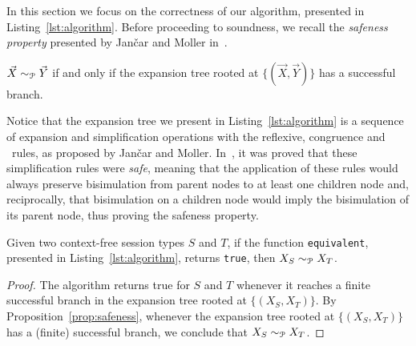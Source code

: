 In this section we focus on the correctness of our algorithm,
presented in Listing~\ref{lst:algorithm}.
Before proceeding to soundness, we recall the \emph{safeness property}
presented by Jan{\v{c}}ar and Moller in~\cite{janvcar1999techniques}.

\begin{proposition} 
\label{prop:safeness}
	$\vec X \sim_{\mathcal P} \vec Y$ if and only if the expansion tree rooted
	at $\{(\vec X, \vec Y)\}$ has a successful branch.
\end{proposition}

Notice that the expansion tree we present in Listing~\ref{lst:algorithm} is
a sequence of expansion and simplification operations with the reflexive,
congruence and \BPA\ rules, as proposed by Jan{\v{c}}ar and Moller.
In~\cite{janvcar1999techniques}, it was proved that these simplification
rules were \emph{safe}, meaning that the application of these rules would
always preserve bisimulation from parent nodes to at least one children node
and, reciprocally, that bisimulation on a children node would imply the
bisimulation of its parent node, thus proving the safeness property.


\begin{theorem}
	Given two context-free session types $S$ and $T$, if the function
	\lstinline|equivalent|, presented in Listing~\ref{lst:algorithm},
	returns \lstinline|true|, then $X_{S} \sim_{\mathcal P} X_{T}$.
\end{theorem}

\begin{proof}
	The algorithm returns \textsf{true} for $S$ and $T$ whenever
	it reaches a finite successful branch in the expansion tree rooted
	at $\{(X_{S}, X_{T})\}$. By Proposition~\ref{prop:safeness}, whenever the
	expansion tree rooted at $\{(X_{S}, X_{T})\}$ has a (finite)
	successful branch, we conclude that $X_{S} \sim_{\mathcal P} X_{T}$.
\end{proof}

